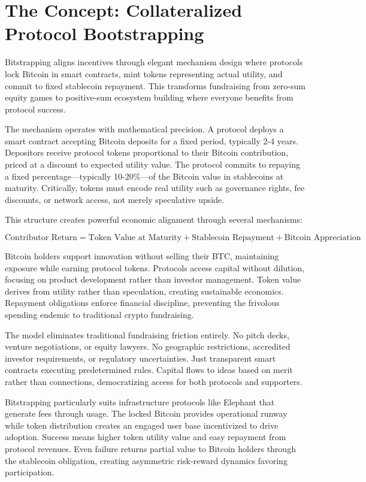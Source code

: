 \section{The Concept: Collateralized Protocol Bootstrapping}

Bitstrapping aligns incentives through elegant mechanism design where protocols lock Bitcoin in smart contracts, mint tokens representing actual utility, and commit to fixed stablecoin repayment. This transforms fundraising from zero-sum equity games to positive-sum ecosystem building where everyone benefits from protocol success.

The mechanism operates with mathematical precision. A protocol deploys a smart contract accepting Bitcoin deposits for a fixed period, typically 2-4 years. Depositors receive protocol tokens proportional to their Bitcoin contribution, priced at a discount to expected utility value. The protocol commits to repaying a fixed percentage—typically 10-20\%—of the Bitcoin value in stablecoins at maturity. Critically, tokens must encode real utility such as governance rights, fee discounts, or network access, not merely speculative upside.

This structure creates powerful economic alignment through several mechanisms:

\[
\text{Contributor Return} = \text{Token Value at Maturity} + \text{Stablecoin Repayment} + \text{Bitcoin Appreciation}
\]

Bitcoin holders support innovation without selling their BTC, maintaining exposure while earning protocol tokens. Protocols access capital without dilution, focusing on product development rather than investor management. Token value derives from utility rather than speculation, creating sustainable economics. Repayment obligations enforce financial discipline, preventing the frivolous spending endemic to traditional crypto fundraising.

The model eliminates traditional fundraising friction entirely. No pitch decks, venture negotiations, or equity lawyers. No geographic restrictions, accredited investor requirements, or regulatory uncertainties. Just transparent smart contracts executing predetermined rules. Capital flows to ideas based on merit rather than connections, democratizing access for both protocols and supporters.

Bitstrapping particularly suits infrastructure protocols like Elephant that generate fees through usage. The locked Bitcoin provides operational runway while token distribution creates an engaged user base incentivized to drive adoption. Success means higher token utility value and easy repayment from protocol revenues. Even failure returns partial value to Bitcoin holders through the stablecoin obligation, creating asymmetric risk-reward dynamics favoring participation.

